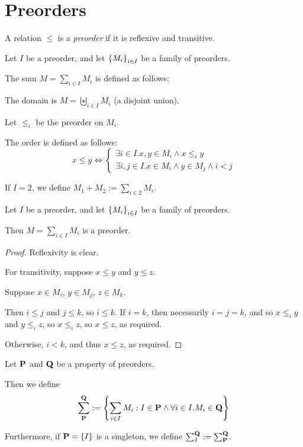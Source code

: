 \section{Preorders}

\begin{definition}
  A relation $\le$ is a \emph{preorder} if it is reflexive and transitive.
\end{definition}

\begin{definition}
  Let $I$ be a preorder, and let $\left\{ {M_i} \right\}_{i \in I}$ be a family of preorders.

  The sum $M = \sum_{i \in I} M_i$ is defined as follows:

  The domain is $M = \biguplus_{i \in I} M_i$ (a disjoint union).

  Let $\le_i$ be the preorder on $M_i$.

  The order is defined as follows:
  \[
    x \le y \iff \begin{cases}
      \exists i \in I. x, y \in M_i \land x \le_i y \\
      \exists i, j \in I. x \in M_i \land y \in M_j \land i < j
    \end{cases}
  \]

  If $I = 2$, we define $M_1 + M_2 := \sum_{i \in 2} M_i$.
\end{definition}

\begin{lemma}
  Let $I$ be a preorder, and let $\left\{ {M_i} \right\}_{i \in I}$ be a family of preorders.

  Then $M = \sum_{i \in I} M_i$ is a preorder.
\end{lemma}

\begin{proof}
  Reflexivity is clear.

  For transitivity, suppose $x \le y$ and $y \le z$.

  Suppose $x \in M_i$, $y \in M_j$, $z \in M_k$.

  Then $i \le j$ and $j \le k$, so $i \le k$.
  If $i = k$, then necessarily $i = j = k$, and so $x \le_i y$ and $y \le_i z$,
  so $x \le_i z$, so $x \le z$, as required.

  Otherwise, $i < k$, and thus $x \le z$, as required.
\end{proof}

\begin{definition}
  Let $\mathbf{P}$ and $\mathbf{Q}$ be a property of preorders.

  Then we define
  \[
    \sum_{\mathbf{P}}^{\mathbf{Q}} := \left\{ {\sum_{i \in I}{M_i} : I \in \mathbf{P} \wedge \forall i \in I. M_i \in \mathbf{Q}} \right\}
  \]

  Furthermore, if $\mathbf{P} = \left\{ {I} \right\}$ is a singleton, we define $\sum_{I}^{\mathbf{Q}} := \sum_{\mathbf{P}}^{\mathbf{Q}}$.
\end{definition}

